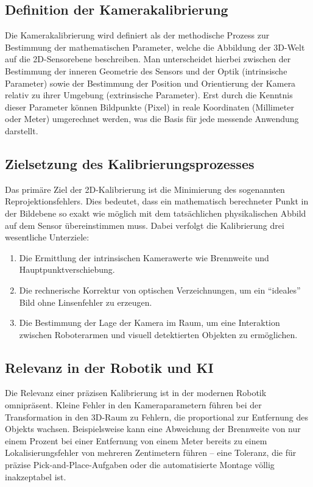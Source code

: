 \documentclass[12pt,a4paper,parskip=half]{scrartcl}
\begin{document}
\subsection{Definition der Kamerakalibrierung}
Die Kamerakalibrierung wird definiert als der methodische Prozess zur Bestimmung der mathematischen Parameter, welche die Abbildung der 3D-Welt auf die 2D-Sensorebene beschreiben. Man unterscheidet hierbei zwischen der Bestimmung der inneren Geometrie des Sensors und der Optik (intrinsische Parameter) sowie der Bestimmung der Position und Orientierung der Kamera relativ zu ihrer Umgebung (extrinsische Parameter). Erst durch die Kenntnis dieser Parameter können Bildpunkte (Pixel) in reale Koordinaten (Millimeter oder Meter) umgerechnet werden, was die Basis für jede messende Anwendung darstellt.

\subsection{Zielsetzung des Kalibrierungsprozesses}
Das primäre Ziel der 2D-Kalibrierung ist die Minimierung des sogenannten Reprojektionsfehlers. Dies bedeutet, dass ein mathematisch berechneter Punkt in der Bildebene so exakt wie möglich mit dem tatsächlichen physikalischen Abbild auf dem Sensor übereinstimmen muss. Dabei verfolgt die Kalibrierung drei wesentliche Unterziele:
\begin{enumerate}
    \item Die Ermittlung der intrinsischen Kamerawerte wie Brennweite und Hauptpunktverschiebung.
    \item Die rechnerische Korrektur von optischen Verzeichnungen, um ein \enquote{ideales} Bild ohne Linsenfehler zu erzeugen.
    \item Die Bestimmung der Lage der Kamera im Raum, um eine Interaktion zwischen Roboterarmen und visuell detektierten Objekten zu ermöglichen.
\end{enumerate}

\subsection{Relevanz in der Robotik und KI}
Die Relevanz einer präzisen Kalibrierung ist in der modernen Robotik omnipräsent. Kleine Fehler in den Kameraparametern führen bei der Transformation in den 3D-Raum zu Fehlern, die proportional zur Entfernung des Objekts wachsen. Beispielsweise kann eine Abweichung der Brennweite von nur einem Prozent bei einer Entfernung von einem Meter bereits zu einem Lokalisierungsfehler von mehreren Zentimetern führen – eine Toleranz, die für präzise Pick-and-Place-Aufgaben oder die automatisierte Montage völlig inakzeptabel ist.
\end{document}

